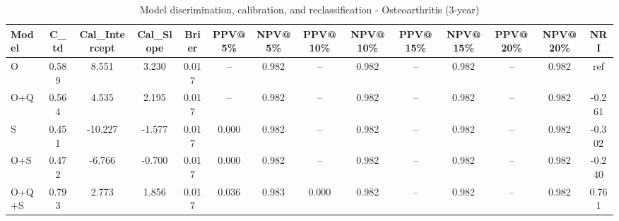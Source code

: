 \begin{table}[htbp]
\centering
\small
\caption{Model discrimination, calibration, and reclassification - Osteoarthritis (3-year)}
\label{tab:perf_osteoarthritis_3y}
\begin{tabular}{lccccccccccccc}
\toprule
Model & C\_td & Cal\_Intercept & Cal\_Slope & Brier & PPV@5\% & NPV@5\% & PPV@10\% & NPV@10\% & PPV@15\% & NPV@15\% & PPV@20\% & NPV@20\% & NRI \\
\midrule
O & 0.589 & 8.551 & 3.230 & 0.017 & -- & 0.982 & -- & 0.982 & -- & 0.982 & -- & 0.982 & ref \\
O+Q & 0.564 & 4.535 & 2.195 & 0.017 & -- & 0.982 & -- & 0.982 & -- & 0.982 & -- & 0.982 & -0.261 \\
S & 0.451 & -10.227 & -1.577 & 0.017 & 0.000 & 0.982 & -- & 0.982 & -- & 0.982 & -- & 0.982 & -0.302 \\
O+S & 0.472 & -6.766 & -0.700 & 0.017 & 0.000 & 0.982 & -- & 0.982 & -- & 0.982 & -- & 0.982 & -0.240 \\
O+Q+S & 0.793 & 2.773 & 1.856 & 0.017 & 0.036 & 0.983 & 0.000 & 0.982 & -- & 0.982 & -- & 0.982 & 0.761 \\
\bottomrule
\end{tabular}
\end{table}
